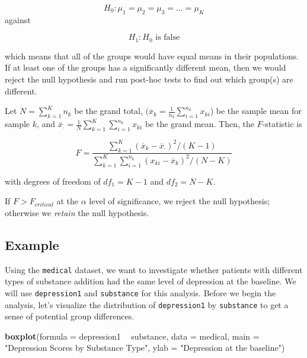 \documentclass[]{book}
\newenvironment{Shaded}{\begin{snugshade}}{\end{snugshade}}
\newcommand{\DataTypeTok}[1]{\textcolor[rgb]{0.13,0.29,0.53}{#1}}
\newcommand{\KeywordTok}[1]{\textcolor[rgb]{0.13,0.29,0.53}{\textbf{#1}}}
\newcommand{\NormalTok}[1]{#1}
\newcommand{\OperatorTok}[1]{\textcolor[rgb]{0.81,0.36,0.00}{\textbf{#1}}}
\newcommand{\StringTok}[1]{\textcolor[rgb]{0.31,0.60,0.02}{#1}}
\begin{document}
\[H_0: \mu_1=\mu_2=\mu_3=\dots=\mu_K\]
against

\[H_1: H_0 \text{ is false}\]

which means that all of the groups would have equal means in their populations. If at least one of the groups has a significantly different mean, then we would reject the null hypothesis and run post-hoc tests to find out which group(s) are different.

Let \(N = \sum_{k = 1}^{K} n_k\) be the grand total, \((\overline{x}_k = \frac{1}{n_k} \sum_{i = 1}^{n_k} x_{ki}\)) be the sample mean for sample \(k\), and \(\overline{x}_{\cdot} = \frac{1}{N} \sum_{k = 1}^{K} \sum_{i = 1}^{n_k} x_{ki}\) be the grand mean. Then, the \(F\)-statistic is

\[F = \frac{\sum_{k = 1}^{K}\left(\overline{x}_k - \overline{x}_{\cdot}\right)^2/(K - 1)}{\sum_{k = 1}^{K} \sum_{i = 1}^{n_k} \left(x_{ki} - \overline{x}_k\right)^2/(N - K)}\]

with degrees of freedom of \(df_1 = K - 1\) and \(df_2 = N - K\).

If \(F > F_{critical}\) at the \(\alpha\) level of significance, we reject the null hypothesis; otherwise we \emph{retain} the null hypothesis.

\hypertarget{example-3}{%
\subsection{Example}\label{example-3}}

Using the \texttt{medical} dataset, we want to investigate whether patients with different types of substance addition had the same level of depression at the baseline. We will use \texttt{depression1} and \texttt{substance} for this analysis. Before we begin the analysis, let's visualize the distribution of \texttt{depression1} by \texttt{substance} to get a sense of potential group differences.

\begin{Shaded}
\begin{Highlighting}[]
\KeywordTok{boxplot}\NormalTok{(}\DataTypeTok{formula =}\NormalTok{ depression1 }\OperatorTok{~}\StringTok{ }\NormalTok{substance,}
        \DataTypeTok{data =}\NormalTok{ medical,}
        \DataTypeTok{main =} \StringTok{"Depression Scores by Substance Type"}\NormalTok{,}
        \DataTypeTok{ylab =} \StringTok{"Depression at the baseline"}\NormalTok{)}
\end{Highlighting}
\end{Shaded}
\end{document}
